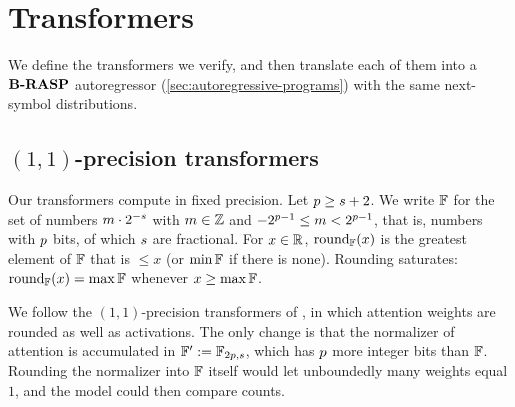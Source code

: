 
\providecommand{\Facc}{\F'}                                   %
\providecommand{\avghardmax}{\mathrm{avghardmax}}
\providecommand{\Wq}{W_{\textnormal{Q}}}
\providecommand{\Wk}{W_{\textnormal{K}}}
\providecommand{\Wv}{W_{\textnormal{V}}}
\providecommand{\Wout}{W_{\textnormal{out}}}
\providecommand{\bitof}[2]{\langle #1\rangle_{#2}}            %
\providecommand{\cntge}[2]{\exists^{\geq #1} y\leq x.\, #2}
\providecommand{\cntgestrict}[2]{\exists^{\geq #1} y< x.\, #2}
\providecommand{\cnteq}[2]{\exists^{= #1} y\leq x.\, #2}
\providecommand{\pcount}[1]{\overleftarrow{\#}[#1]}                %

\section{Transformers}
\label{sec:transformers}

We define the transformers we verify, and then translate each of them into a ${\textbf{B-RASP}}$
autoregressor (\cref{sec:autoregressive-programs}) with the same next-symbol distributions.

\subsection{\texorpdfstring{$(1,1)$}{(1,1)}-precision transformers}
\label{sec:transformer_definitions}

Our transformers compute in fixed precision.
Let ${p}\geq{s}+2$.
We write $\mathbb{F}$ for the set of numbers $m\cdot2^{-{s}}$ with $m\in{{ \mathbb{Z}}}$ and
$-2^{{p}-1}\leq m<2^{{p}-1}$, that is, numbers with ${p}$ bits, of which ${s}$ are fractional.
For $x\in{{ \mathbb{R}}}$, $\textnormal{round}_{\mathbb{F}}(x)$ is the greatest element of $\mathbb{F}$ that is $\leq x$ (or $\min\mathbb{F}$ if there is none).
Rounding saturates: $\textnormal{round}_{\mathbb{F}}(x)=\max\mathbb{F}$ whenever $x\geq\max\mathbb{F}$.

We follow the $(1,1)$-precision transformers of \citet{li-cotterell-2025-characterizing,yang-etal-2025-length},
in which attention weights are rounded as well as activations.
The only change is that the normalizer of attention is accumulated in
$\Facc := \F_{2\numbits,\fracbits}$, which has ${p}$ more integer bits than $\mathbb{F}$.
Rounding the normalizer into $\mathbb{F}$ itself would let unboundedly many weights equal $1$,
and the model could then compare counts.


